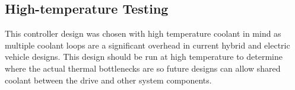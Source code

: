 \subsection{High-temperature Testing}
This controller design was chosen with high temperature coolant in mind as
multiple coolant loops are a significant overhead in current hybrid and
electric vehicle designs.
This design should be run at high temperature to determine where the actual
thermal bottlenecks are so future designs can allow shared coolant between
the drive and other system components.

